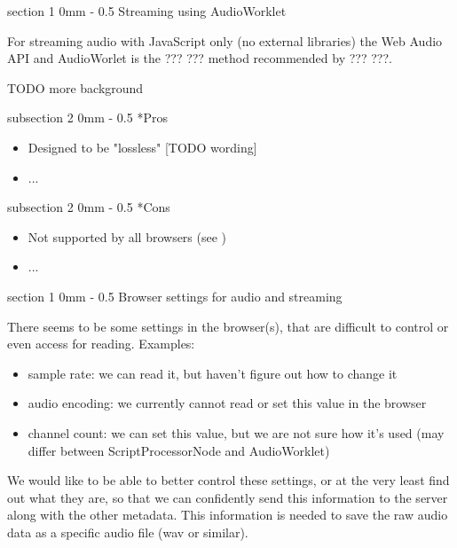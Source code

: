 \documentclass[11pt, a4paper, twoside]{article}
\makeatletter
\renewcommand{\subsection}{\@startsection
   {subsection}%
   {2}%
   {0mm}%
   {-\baselineskip}%
   {0.5\baselineskip}%
   {\bfseries\sffamily\large}}%
\renewcommand{\section}{\@startsection
   {section}%
   {1}%
   {0mm}%
   {-\baselineskip}%
   {0.5\baselineskip}%
   {\bfseries\sffamily\Large}}%
\makeatother
\begin{document}
\section{Streaming using AudioWorklet}

For streaming audio with JavaScript only (no external libraries) the Web Audio API and AudioWorlet\cite{audioworklet} is the ??? ??? method recommended by ??? ???.

TODO more background


\subsection*{Pros}
\begin{itemize}
\item Designed to be "lossless" [TODO wording]
\item ...
  \end{itemize}

\subsection*{Cons}
\begin{itemize}
\item Not supported by all browsers (see \cite{audioworklet})
\item ...
\end{itemize}




\section{Browser settings for audio and streaming}

There seems to be some settings in the browser(s), that are difficult to control or even access for reading. Examples:

\begin{itemize}
\item sample rate: we can read it, but haven't figure out how to change it
\item audio encoding: we currently cannot read or set this value in the browser
\item channel count: we can set this value, but we are not sure how it's used (may differ between ScriptProcessorNode and AudioWorklet)
\end{itemize}

We would like to be able to better control these settings, or at the very least find out what they are, so that we can confidently send this information to the server along with the other metadata. This information is needed to save the raw audio data as a specific audio file (wav or similar).
\end{document}
